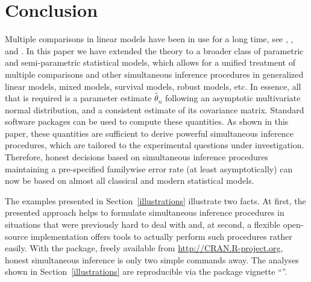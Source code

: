 \documentclass[12pt,a4paper]{article}
\begin{document}




\section{Conclusion}

Multiple comparisons in linear models have been in use for a long time, see 
\cite{HochbergTamhane1987}, \cite{Hsu1996}, and \cite{Bretzetal2008}. In
this paper we have extended the theory to a broader class of parametric and
semi-parametric statistical models, which allows for a unified treatment of
multiple comparisons and other simultaneous inference procedures in
generalized linear models, mixed models, survival models, robust models, etc.
In essence, all that is required is a parameter estimate $\hat{\theta}_n$
following an asymptotic multivariate normal distribution, and a consistent
estimate of its covariance matrix. Standard software packages
can be used to compute these quantities. As shown in this paper, these
quantities are sufficient to derive powerful simultaneous inference
procedures, which are tailored to the experimental questions under
investigation. Therefore, honest decisions based on simultaneous inference
procedures maintaining a pre-specified familywise error rate (at least
asymptotically) can now be
based on almost all classical and modern statistical models.

The examples presented in Section~\ref{illustrations} illustrate two facts.
At first, the presented approach helps to formulate simultaneous inference
procedures in situations that were previously hard to deal with and, at
second, a flexible open-source implementation offers tools to actually
perform such procedures rather easily. With the  package,
freely available from \url{http://CRAN.R-project.org}, honest simultaneous
inference is only two simple \RR{} commands away. The analyses shown
in Section~\ref{illustrations} are reproducible via the 
package vignette ``''.



\end{document}
